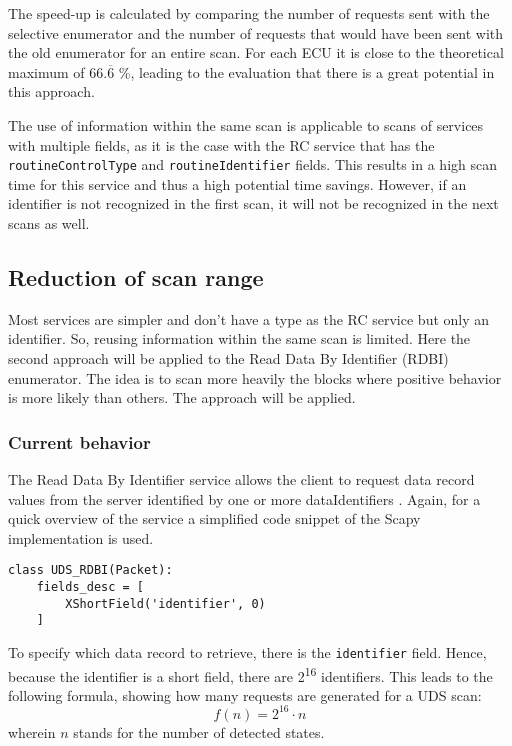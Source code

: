 The speed-up is calculated by comparing the number of requests sent with the selective enumerator and the number of requests that would have been sent with the old enumerator for an entire scan. For each ECU it is close to the theoretical maximum of $66.\overline{6}$ \%, leading to the evaluation that there is a great potential in this approach.

The use of information within the same scan is applicable to scans of services with multiple fields, as it is the case with the RC service that has the \texttt{routineControlType} and \texttt{routineIdentifier} fields. This results in a high scan time for this service and thus a high potential time savings. However, if an identifier is not recognized in the first scan, it will not be recognized in the next scans as well.


\subsection{Reduction of scan range}
Most services are simpler and don't have a type as the RC service but only an identifier. So, reusing information within the same scan is limited. Here the second approach will be applied to the Read Data By Identifier (RDBI) enumerator. The idea is to scan more heavily the blocks where positive behavior is more likely than others. The approach will be applied.

\subsubsection{Current behavior}

The Read Data By Identifier service allows the client to request data record values from the server identified by one or more dataIdentifiers \cite{iso14229}. Again, for a quick overview of the service a simplified code snippet of the Scapy implementation is used.

\begin{samepage}
\begin{verbatim}
class UDS_RDBI(Packet):
    fields_desc = [
        XShortField('identifier', 0)
    ]
\end{verbatim}
\end{samepage}

To specify which data record to retrieve, there is the \texttt{identifier} field. Hence, because the identifier is a short field, there are 2\textsuperscript{16} identifiers. This leads to the following formula, showing how many requests are generated for a UDS scan:
\[f(n)=2^{16} \cdot n\]
wherein $n$ stands for the number of detected states. 

